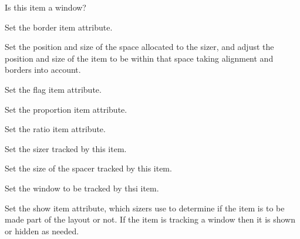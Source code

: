 
Is this item a window?


\label{wxsizeritemsetborder}


Set the border item attribute.

\label{wxsizeritemsetdimension}


Set the position and size of the space allocated to the sizer, and
adjust the position and size of the item to be within that space
taking alignment and borders into account.


\label{wxsizeritemsetflag}


Set the flag  item attribute.


\label{wxsizeritemsetinitsize}



\label{wxsizeritemsetproportion}


Set the proportion item attribute.

\label{wxsizeritemsetratio}




Set the ratio item attribute.


\label{wxsizeritemsetsizer}


Set the sizer tracked by this item.


\label{wxsizeritemsetspacer}


Set the size of the spacer tracked by this item.


\label{wxsizeritemsetwindow}


Set the window to be tracked by thsi item.


\label{wxsizeritemshow}


Set the show item attribute, which sizers use to determine if the item
is to be made part of the layout or not.  If the item is tracking a
window then it is shown or hidden as needed.

